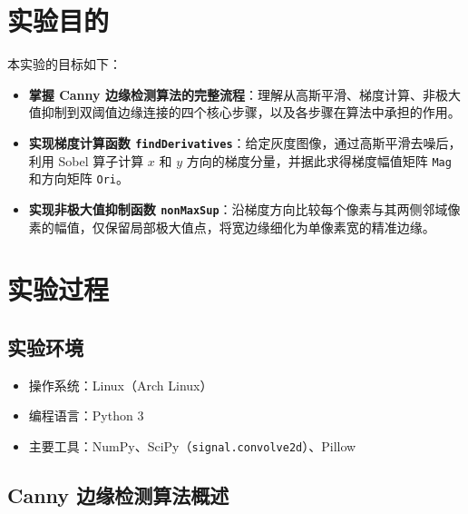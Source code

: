 \documentclass[12pt,a4paper]{ctexart}
\title{\reporttitle}
\author{\authname：\underline{李祥熙} \quad \authid：\underline{2234412799} \quad \class：\underline{计算机2301}}
\date{}
\begin{document}
\maketitle
\tableofcontents
\newpage

\section{实验目的}

本实验的目标如下：

\begin{itemize}
  \item \textbf{掌握 Canny 边缘检测算法的完整流程}：理解从高斯平滑、梯度计算、非极大值抑制到双阈值边缘连接的四个核心步骤，以及各步骤在算法中承担的作用。
  \item \textbf{实现梯度计算函数 \texttt{findDerivatives}}：给定灰度图像，通过高斯平滑去噪后，利用 Sobel 算子计算 $x$ 和 $y$ 方向的梯度分量，并据此求得梯度幅值矩阵 \texttt{Mag} 和方向矩阵 \texttt{Ori}。
  \item \textbf{实现非极大值抑制函数 \texttt{nonMaxSup}}：沿梯度方向比较每个像素与其两侧邻域像素的幅值，仅保留局部极大值点，将宽边缘细化为单像素宽的精准边缘。
\end{itemize}

\section{实验过程}

\subsection{实验环境}

\begin{itemize}
  \item 操作系统：Linux（Arch Linux）
  \item 编程语言：Python 3
  \item 主要工具：NumPy、SciPy（\texttt{signal.convolve2d}）、Pillow
\end{itemize}

\subsection{Canny 边缘检测算法概述}
\end{document}
